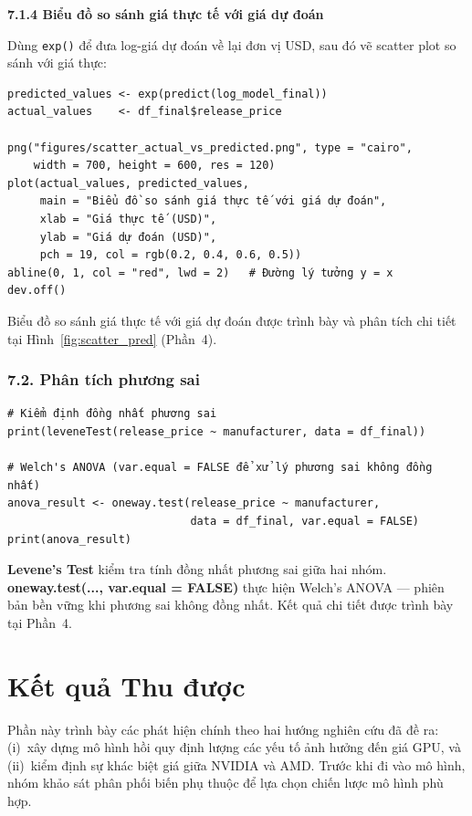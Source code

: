 \documentclass[a4paper]{article}
\begin{document}
\textbf{7.1.4 Biểu đồ so sánh giá thực tế với giá dự đoán}

Dùng \texttt{exp()} để đưa log-giá dự đoán về lại đơn vị USD, sau đó vẽ scatter plot so sánh với giá thực:

\begin{verbatim}
predicted_values <- exp(predict(log_model_final))
actual_values    <- df_final$release_price

png("figures/scatter_actual_vs_predicted.png", type = "cairo",
    width = 700, height = 600, res = 120)
plot(actual_values, predicted_values,
     main = "Biểu đồ so sánh giá thực tế với giá dự đoán",
     xlab = "Giá thực tế (USD)",
     ylab = "Giá dự đoán (USD)",
     pch = 19, col = rgb(0.2, 0.4, 0.6, 0.5))
abline(0, 1, col = "red", lwd = 2)   # Đường lý tưởng y = x
dev.off()
\end{verbatim}

Biểu đồ so sánh giá thực tế với giá dự đoán được trình bày và phân tích chi tiết tại Hình~\ref{fig:scatter_pred} (Phần~4).



\subsubsection{7.2. Phân tích phương sai}

\begin{verbatim}
# Kiểm định đồng nhất phương sai
print(leveneTest(release_price ~ manufacturer, data = df_final))

# Welch's ANOVA (var.equal = FALSE để xử lý phương sai không đồng nhất)
anova_result <- oneway.test(release_price ~ manufacturer,
                            data = df_final, var.equal = FALSE)
print(anova_result)
\end{verbatim}

\textbf{Levene's Test} kiểm tra tính đồng nhất phương sai giữa hai nhóm. \textbf{oneway.test(..., var.equal = FALSE)} thực hiện Welch's ANOVA --- phiên bản bền vững khi phương sai không đồng nhất. Kết quả chi tiết được trình bày tại Phần~4.


\section{Kết quả Thu được}

Phần này trình bày các phát hiện chính theo hai hướng nghiên cứu đã đề ra: (i)~xây dựng mô hình hồi quy định lượng các yếu tố ảnh hưởng đến giá GPU, và (ii)~kiểm định sự khác biệt giá giữa NVIDIA và AMD. Trước khi đi vào mô hình, nhóm khảo sát phân phối biến phụ thuộc để lựa chọn chiến lược mô hình phù hợp.
\end{document}
